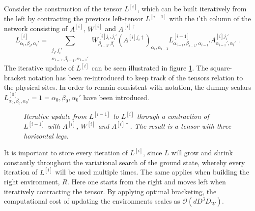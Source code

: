 Consider the construction of the tensor $L^{[i]}$, which can be built iteratively from the left by contracting the previous left-tensor $L^{[i-1]}$ with the i'th column of the network consisting of $A^{[i]}$, $W^{[i]}$ and $A^{[i] \dag}$
\begin{equation}
	L_{\alpha_i , \beta_i , \alpha_i '}^{[i]} = \sum_{\substack{ j_i , j_i ' \\ \alpha_{i-1} , \beta_{i-1} , \alpha_{i-1} '}} W_{\beta_{i-1} , \beta_i}^{[i] j_i , j_i '} \left( A^{[i] j_i \dag} \right)_{\alpha_i , \alpha_{i-1}} L_{\alpha_{i-1} , \beta_{i-1} , \alpha_{i-1} '}^{[i-1]} A_{\alpha_{i-1} ' , \alpha_i '}^{[i] j_i '} \; .
\end{equation}
The iterative update of $L^{[i]}$ can be seen illustrated in figure \ref{fig:buildLTensor}. The square-bracket notation has been re-introduced to keep track of the tensors relation to the physical sites. In order to remain consistent with notation, the dummy scalars $L_{\alpha_0 , \beta_0 , \alpha_0 '}^{[0]}  = 1  = \alpha_0 , \beta_0 , \alpha_0 '$ have been introduced.\\
\begin{figure}[h!]
	\centering
	
	\caption{\textit{Iterative update from $L^{[i-1]}$ to $L^{[i]}$ through a contraction of $L^{[i-1]}$ with $A^{[i]}$, $W^{[i]}$ and $A^{[i] \dag}$. The result is a tensor with three horizontal legs.}}
	\label{fig:buildLTensor}
\end{figure}
It is important to store every iteration of $L^{[i]}$, since $L$ will grow and shrink constantly throughout the variational search of the ground state, whereby every iteration of $L^{[i]}$ will be used multiple times.
The same applies when building the right environment, $R$. Here one starts from the right and moves left when iteratively contracting the tensor. By applying optimal bracketing, the computational cost of updating the environments scales as $\mathcal{O}(d D^3 D_W)$.
  

